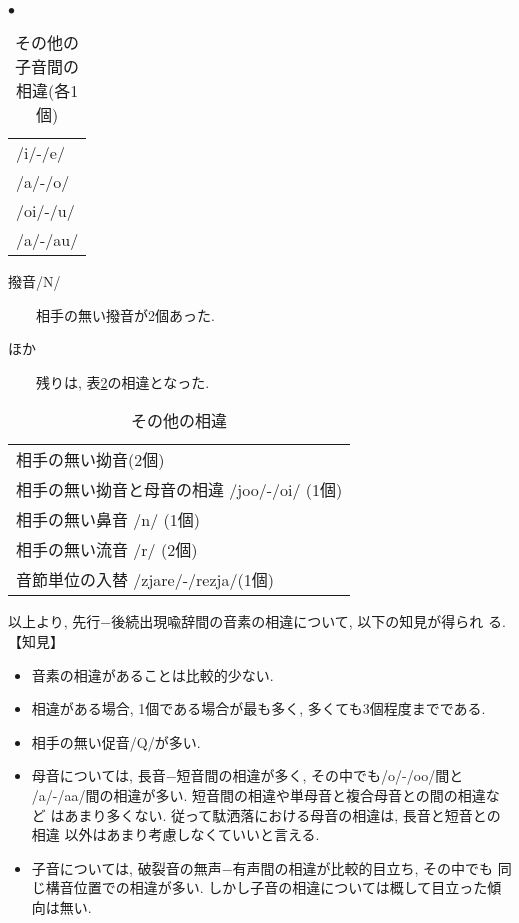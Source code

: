 \begin{list}{\Large $\bullet$}{}
\begin{table}
\begin{center}
\caption{その他の子音間の相違(各1個)}\label{different3}
\begin{tabular}{l}
/i/-/e/\\/a/-/o/\\/oi/-/u/\\/a/-/au/\\
\end{tabular}
\end{center}
\end{table}

\item 撥音/N/

\ \ \ \ 相手の無い撥音が2個あった. 

\item ほか

\ \ \ \ 残りは, 表\ref{different4}の相違となった. 

\addtocounter{footnote}{-1}
\begin{table}
\begin{center}
\caption{その他の相違}\label{different4}
\begin{tabular}{l}
相手の無い拗音(2個)\\相手の無い拗音と母音の相違 /joo/-/oi/ (1個)\\
相手の無い鼻音 /n/ (1個)\\相手の無い流音 /r/ (2個)\\
音節単位の入替 /zjare/-/rezja/\footnotemark (1個)\\
\end{tabular}
\end{center}
\end{table}
\end{list}

以上より, 先行−後続出現喩辞間の音素の相違について, 以下の知見が得られ
る. \vspace*{2em}\\ 
【知見】
\begin{itemize}
\item 音素の相違があることは比較的少ない. 
\item 相違がある場合, 1個である場合が最も多く, 多くても3個程度までである. 
\item 相手の無い促音/Q/が多い. 
\item 母音については, 長音−短音間の相違が多く, その中でも/o/-/oo/間と
/a/-/aa/間の相違が多い. 短音間の相違や単母音と複合母音との間の相違など
はあまり多くない. 従って駄洒落における母音の相違は, 長音と短音との相違
以外はあまり考慮しなくていいと言える.  
\item 子音については, 破裂音の無声−有声間の相違が比較的目立ち, その中でも
同じ構音位置での相違が多い. しかし子音の相違については概して目立った傾
向は無い.  
\end{itemize}

